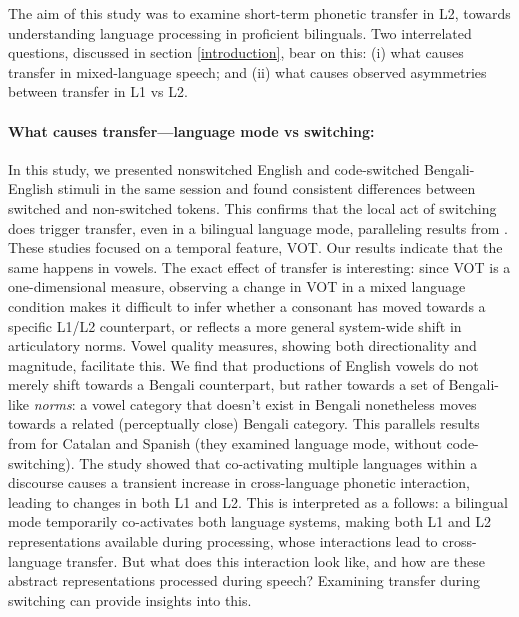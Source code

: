 \documentclass[12 pt]{article}
\begin{document}
The aim of this study was to examine short-term phonetic transfer in L2, towards understanding language processing in proficient bilinguals. Two interrelated questions, discussed in section \ref{introduction}, bear on this: (i) what causes transfer in mixed-language speech; and (ii) what causes observed asymmetries between transfer in L1 vs L2. 

\paragraph{\textbf{What causes transfer---language mode vs switching:}}

In this study, we presented nonswitched English and code-switched Bengali-English stimuli in the same session and found consistent differences between switched and non-switched tokens. This confirms that the local act of switching does trigger transfer, even in a bilingual language mode, paralleling results from \cite{olson2016role, tsui2019impact, piccinini2015voice}. These studies focused on a temporal feature, VOT. Our results indicate that the same happens in vowels. The exact effect of transfer is interesting: since VOT is a one-dimensional measure, observing a change in VOT in a mixed language condition makes it difficult to infer whether a consonant has moved towards a specific L1/L2 counterpart, or reflects a more general system-wide shift in articulatory norms. Vowel quality measures, showing both directionality and magnitude, facilitate this. We find that productions of English vowels do not merely shift towards a Bengali counterpart, but rather towards a set of Bengali-like \textit{norms}: a vowel category that doesn't exist in Bengali nonetheless moves towards a related (perceptually close) Bengali category. This parallels results from \cite{simonet2014phonetic} for Catalan and Spanish (they examined language mode, without code-switching). The \cite{simonet2014phonetic} study showed that co-activating multiple languages within a discourse causes a transient increase in cross-language phonetic interaction, leading to changes in both L1 and L2. This is interpreted as a follows: a bilingual mode temporarily co-activates both language systems, making both L1 and L2 representations available during processing, whose interactions lead to cross-language transfer. But what does this interaction look like, and how are these abstract representations processed during speech? Examining transfer during switching can provide insights into this.
\end{document}
